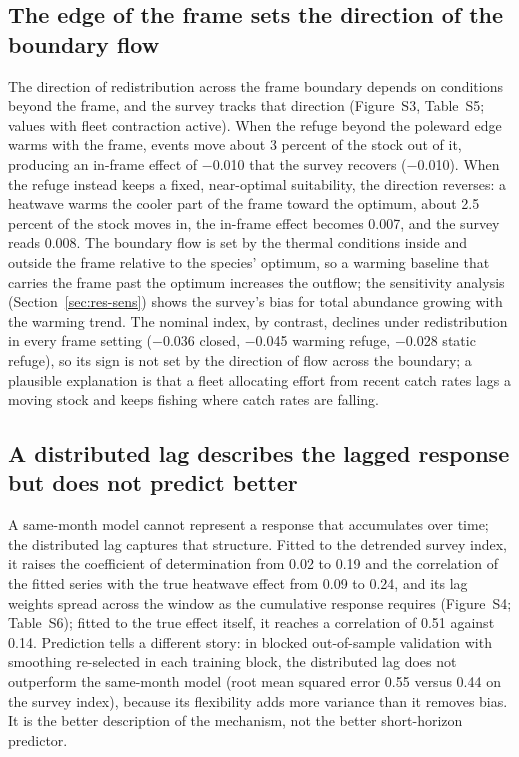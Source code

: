 \documentclass[11pt,a4paper]{article}
\begin{document}
\subsection{The edge of the frame sets the direction of the boundary flow}
\label{sec:res-frame}

The direction of redistribution across the frame boundary depends on conditions beyond the frame, and the survey tracks that direction (Figure~S3, Table~S5; values with fleet contraction active). When the refuge beyond the poleward edge warms with the frame, events move about 3 percent of the stock out of it, producing an in-frame effect of $-$0.010 that the survey recovers ($-$0.010). When the refuge instead keeps a fixed, near-optimal suitability, the direction reverses: a heatwave warms the cooler part of the frame toward the optimum, about 2.5 percent of the stock moves in, the in-frame effect becomes 0.007, and the survey reads 0.008. The boundary flow is set by the thermal conditions inside and outside the frame relative to the species' optimum, so a warming baseline that carries the frame past the optimum increases the outflow; the sensitivity analysis (Section~\ref{sec:res-sens}) shows the survey's bias for total abundance growing with the warming trend. The nominal index, by contrast, declines under redistribution in every frame setting ($-$0.036 closed, $-$0.045 warming refuge, $-$0.028 static refuge), so its sign is not set by the direction of flow across the boundary; a plausible explanation is that a fleet allocating effort from recent catch rates lags a moving stock and keeps fishing where catch rates are falling.

\subsection{A distributed lag describes the lagged response but does not predict better}
\label{sec:res-temporal}

A same-month model cannot represent a response that accumulates over time; the distributed lag captures that structure. Fitted to the detrended survey index, it raises the coefficient of determination from 0.02 to 0.19 and the correlation of the fitted series with the true heatwave effect from 0.09 to 0.24, and its lag weights spread across the window as the cumulative response requires (Figure~S4; Table~S6); fitted to the true effect itself, it reaches a correlation of 0.51 against 0.14. Prediction tells a different story: in blocked out-of-sample validation with smoothing re-selected in each training block, the distributed lag does not outperform the same-month model (root mean squared error 0.55 versus 0.44 on the survey index), because its flexibility adds more variance than it removes bias. It is the better description of the mechanism, not the better short-horizon predictor.
\end{document}
